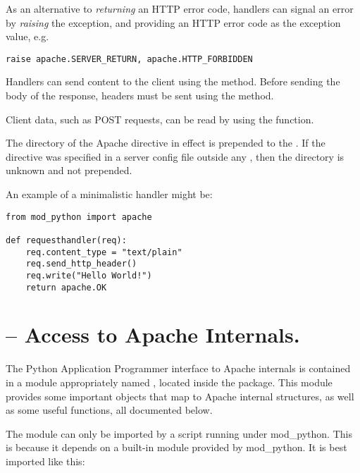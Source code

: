 As an alternative to \emph{returning} an HTTP error code, handlers can
signal an error by \emph{raising} the 
exception, and providing an HTTP error code as the exception value,
e.g.

\begin{verbatim}
raise apache.SERVER_RETURN, apache.HTTP_FORBIDDEN
\end{verbatim}
              
Handlers can send content to the client using the 
method. Before sending the body of the response, headers must be
sent using the  method.

Client data, such as POST requests, can be read by using the
 function.

 The directory of the Apache  
directive in effect is prepended to the . If the
directive was specified in a server config file outside any
, then the directory is unknown and not prepended.

An example of a minimalistic handler might be: 

\begin{verbatim}
from mod_python import apache

def requesthandler(req):
    req.content_type = "text/plain"
    req.send_http_header()
    req.write("Hello World!")
    return apache.OK
\end{verbatim}

\section{ -- Access to Apache Internals.}

The Python Application Programmer interface to Apache internals is
contained in a module appropriately named , located inside the
 package. This module provides some important objects that
map to Apache internal structures, as well as some useful functions,
all documented below.

The  module can only be imported by a script running under
mod_python. This is because it depends on a built-in module
 provided by mod_python. It is best imported like this:

